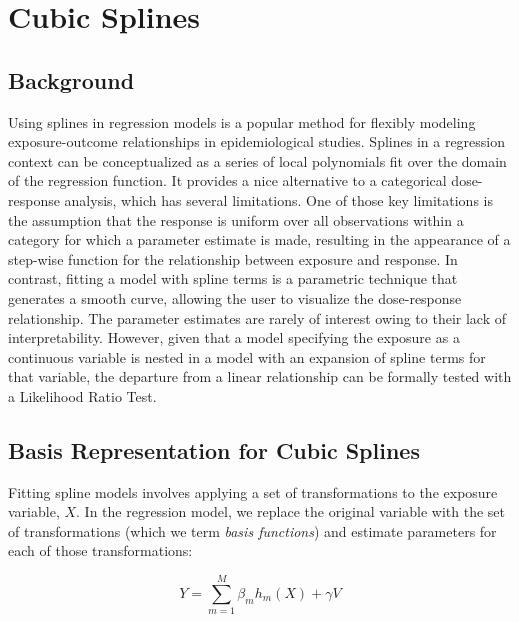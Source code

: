 \documentclass{article}
\begin{document}
\section{Cubic Splines}
\subsection{Background} %
\hspace{\parindent} Using splines in regression models is a popular method for flexibly modeling exposure-outcome relationships in epidemiological studies. \supercite{greenland_dose-response_1995, witte_nested_1997} Splines in a regression context can be conceptualized as a series of local polynomials fit over the domain of the regression function. It provides a nice alternative to a categorical dose-response analysis, which has several limitations. One of those key limitations is the assumption that the response is uniform over all observations within a category for which a parameter estimate is made, resulting in the appearance of a step-wise function for the relationship between exposure and response. \supercite{steenland_practical_2004} In contrast, fitting a model with spline terms is a parametric technique that generates a smooth curve, allowing the user to visualize the dose-response relationship. The parameter estimates are rarely of interest owing to their lack of interpretability. \supercite{steenland_practical_2004} However, given that a model specifying the exposure as a continuous variable is nested in a model with an expansion of spline terms for that variable, the departure from a linear relationship can be formally tested with a Likelihood Ratio Test.\supercite{witte_nested_1997}

\vspace{0.5cm} %
\subsection{Basis Representation for Cubic Splines} %
\hspace{\parindent} Fitting spline models involves applying a set of transformations to the exposure variable, $X$. In the regression model, we replace the original variable with the set of transformations (which we term \textit{basis functions}) and estimate parameters for each of those transformations:

$$Y=\sum_{m=1}^{M}{\beta_mh_m(X)+\gamma V}$$
\end{document}
